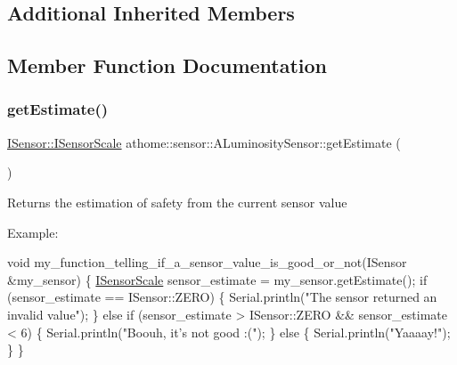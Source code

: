 \subsection*{Additional Inherited Members}


\subsection{Member Function Documentation}
\mbox{\label{classathome_1_1sensor_1_1_a_luminosity_sensor_aa6c0e60c108b0494f0132b033ce3dd82}} 
\subsubsection{\texorpdfstring{get\+Estimate()}{getEstimate()}}
{\footnotesize\ttfamily \mbox{\hyperlink{classathome_1_1sensor_1_1_i_sensor_aa70bc27a4c17c86caf96cca776541ddf}{I\+Sensor\+::\+I\+Sensor\+Scale}} athome\+::sensor\+::\+A\+Luminosity\+Sensor\+::get\+Estimate (\begin{DoxyParamCaption}{ }\end{DoxyParamCaption})\hspace{0.3cm}{\ttfamily [virtual]}}

Returns the estimation of safety from the current sensor value

Example\+:


\begin{DoxyCode}
\textcolor{keywordtype}{void} my\_function\_telling\_if\_a\_sensor\_value\_is\_good\_or\_not(ISensor &my\_sensor) \{
  \mbox{\hyperlink{classathome_1_1sensor_1_1_i_sensor_aa70bc27a4c17c86caf96cca776541ddf}{ISensorScale}} sensor\_estimate = my\_sensor.getEstimate();
  \textcolor{keywordflow}{if} (sensor\_estimate == ISensor::ZERO) \{
    Serial.println(\textcolor{stringliteral}{"The sensor returned an invalid value"});
  \}
  \textcolor{keywordflow}{else} \textcolor{keywordflow}{if} (sensor\_estimate > ISensor::ZERO && sensor\_estimate < 6) \{
    Serial.println(\textcolor{stringliteral}{"Boouh, it's not good :("});
  \}
  \textcolor{keywordflow}{else} \{
    Serial.println(\textcolor{stringliteral}{"Yaaaay!"});
  \}
\}
\end{DoxyCode}
 

